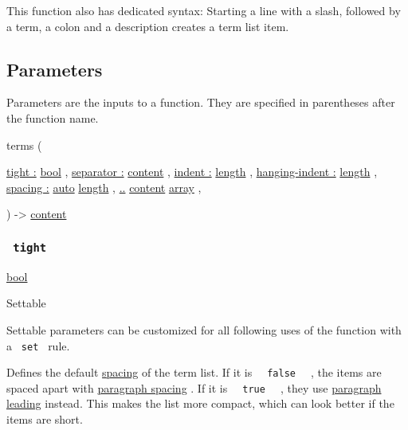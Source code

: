 This function also has dedicated syntax: Starting a line with a slash,
followed by a term, a colon and a description creates a term list item.

\subsection{\texorpdfstring{{ Parameters
}}{ Parameters }}\label{parameters}

\label{parameters-tooltip}
Parameters are the inputs to a function. They are specified in
parentheses after the function name.

{ terms } (

{ \hyperref[parameters-tight]{tight :}
\href{/docs/reference/foundations/bool/}{bool} , } {
\hyperref[parameters-separator]{separator :}
\href{/docs/reference/foundations/content/}{content} , } {
\hyperref[parameters-indent]{indent :}
\href{/docs/reference/layout/length/}{length} , } {
\hyperref[parameters-hanging-indent]{hanging-indent :}
\href{/docs/reference/layout/length/}{length} , } {
\hyperref[parameters-spacing]{spacing :}
\href{/docs/reference/foundations/auto/}{auto}
\href{/docs/reference/layout/length/}{length} , } {
\hyperref[parameters-children]{..}
\href{/docs/reference/foundations/content/}{content}
\href{/docs/reference/foundations/array/}{array} , }

) -\textgreater{} \href{/docs/reference/foundations/content/}{content}

\subsubsection{\texorpdfstring{\texttt{\ tight\ }}{ tight }}\label{parameters-tight}

\href{/docs/reference/foundations/bool/}{bool}

{{ Settable }}

\label{parameters-tight-settable-tooltip}
Settable parameters can be customized for all following uses of the
function with a \texttt{\ set\ } rule.

Defines the default
\href{/docs/reference/model/terms/\#parameters-spacing}{spacing} of the
term list. If it is \texttt{\ }{\texttt{\ false\ }}\texttt{\ } , the
items are spaced apart with
\href{/docs/reference/model/par/\#parameters-spacing}{paragraph spacing}
. If it is \texttt{\ }{\texttt{\ true\ }}\texttt{\ } , they use
\href{/docs/reference/model/par/\#parameters-leading}{paragraph leading}
instead. This makes the list more compact, which can look better if the
items are short.

